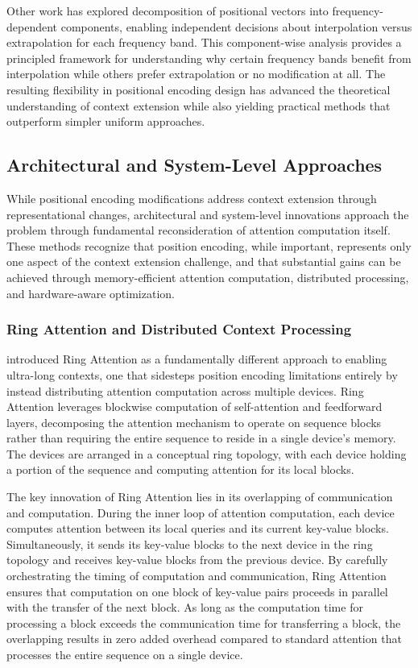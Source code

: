 Other work has explored decomposition of positional vectors into frequency-dependent components, enabling independent decisions about interpolation versus extrapolation for each frequency band. This component-wise analysis provides a principled framework for understanding why certain frequency bands benefit from interpolation while others prefer extrapolation or no modification at all. The resulting flexibility in positional encoding design has advanced the theoretical understanding of context extension while also yielding practical methods that outperform simpler uniform approaches.

\subsection{Architectural and System-Level Approaches}

While positional encoding modifications address context extension through representational changes, architectural and system-level innovations approach the problem through fundamental reconsideration of attention computation itself. These methods recognize that position encoding, while important, represents only one aspect of the context extension challenge, and that substantial gains can be achieved through memory-efficient attention computation, distributed processing, and hardware-aware optimization.

\subsubsection{Ring Attention and Distributed Context Processing}

\citet{liu2023ring} introduced Ring Attention as a fundamentally different approach to enabling ultra-long contexts, one that sidesteps position encoding limitations entirely by instead distributing attention computation across multiple devices. Ring Attention leverages blockwise computation of self-attention and feedforward layers, decomposing the attention mechanism to operate on sequence blocks rather than requiring the entire sequence to reside in a single device's memory. The devices are arranged in a conceptual ring topology, with each device holding a portion of the sequence and computing attention for its local blocks.

The key innovation of Ring Attention lies in its overlapping of communication and computation. During the inner loop of attention computation, each device computes attention between its local queries and its current key-value blocks. Simultaneously, it sends its key-value blocks to the next device in the ring topology and receives key-value blocks from the previous device. By carefully orchestrating the timing of computation and communication, Ring Attention ensures that computation on one block of key-value pairs proceeds in parallel with the transfer of the next block. As long as the computation time for processing a block exceeds the communication time for transferring a block, the overlapping results in zero added overhead compared to standard attention that processes the entire sequence on a single device.


